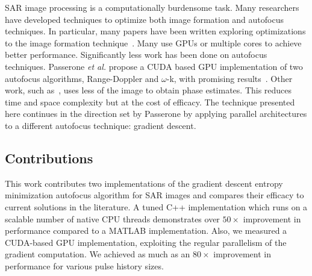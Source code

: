 SAR image processing is a computationally burdensome task. Many researchers have
developed techniques to optimize both image formation and autofocus techniques.
In particular, many papers have been written exploring optimizations to the
image formation technique~\cite{yegulalp1999fast, hartley, liu, clemente, fasih, jin,
park2013efficient}. Many use GPUs or multiple cores to achieve better
performance. Significantly less work has been done on autofocus techniques.
Passerone \textit{et al.} propose a CUDA based GPU implementation of two
autofocus algorithms, Range-Doppler and $\omega$-k, with promising
results~\cite{gpu-sar}. Other work, such as~\cite{less_mem_high_eff_autofocus},
uses less of the image to obtain phase estimates. This reduces time and space
complexity but at the cost of efficacy. The technique presented here continues
in the direction set by Passerone by applying parallel architectures to a
different autofocus technique: gradient descent.

\subsection{Contributions}

This work contributes two implementations of the gradient descent entropy
minimization autofocus algorithm for SAR images and compares their efficacy to
current solutions in the literature. A tuned C++ implementation which runs on a
scalable number of native CPU threads demonstrates over $50\times$ improvement in
performance compared to a MATLAB implementation. Also, we measured a CUDA-based
GPU implementation, exploiting the regular parallelism of the gradient
computation. We achieved as much as an $80\times$ improvement in performance
for various pulse history sizes.
